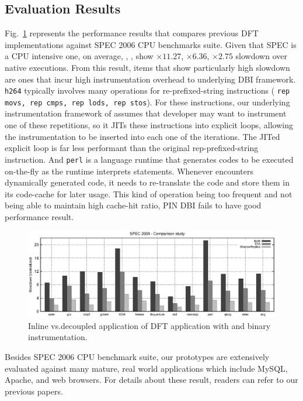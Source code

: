 \subsection{Evaluation Results}
\label{ssec:prev_eval}

Fig.~\ref{fig:s2k6} represents the performance results that compares previous
DFT implementations against SPEC 2006 CPU benchmarks suite. Given that SPEC is
a CPU intensive one, on average, \libdft, \tfa, \sreplica show $\times 11.27$,
$\times 6.36$, $\times 2.75$ slowdown over native executions.
%
From this result, items that show particularly high slowdown are ones that
incur high instrumentation overhead to underlying DBI framework. {\tt h264}
typically involves many operations for re-prefixed-string instructions (\eg
{\tt rep movs, rep cmps, rep lods, rep stos}). For these instructions, our
underlying instrumentation framework of \pin assumes that developer may want to
instrument one of these repetitions, so it JITs these instructions into
explicit loops, allowing the instrumentation to be inserted into each one of
the iterations. The JITed explicit loop is far less performant than the
original rep-prefixed-string instruction. 
%
And {\tt perl} is a language runtime that generates codes to be executed
on-the-fly as the runtime interprets statements. Whenever \pin encounters
dynamically generated code, it needs to re-translate the code and store them in
its code-cache for later usage. This kind of operation being too frequent and
not being able to maintain high cache-hit ratio, PIN DBI fails to have good
performance result.

\begin{figure}[tb]
    \centering
    \includegraphics[width=\linewidth]{figs/s2k6.eps}
    \caption{Inline vs.decoupled application of DFT application with \sreplica
    and binary instrumentation.\label{fig:s2k6}}
\end{figure}

Besides SPEC 2006 CPU benchmark suite, our prototypes are extensively evaluated
against many mature, real world applications which include MySQL, Apache, and
web browsers. For details about these result, readers can refer to our previous
papers.


